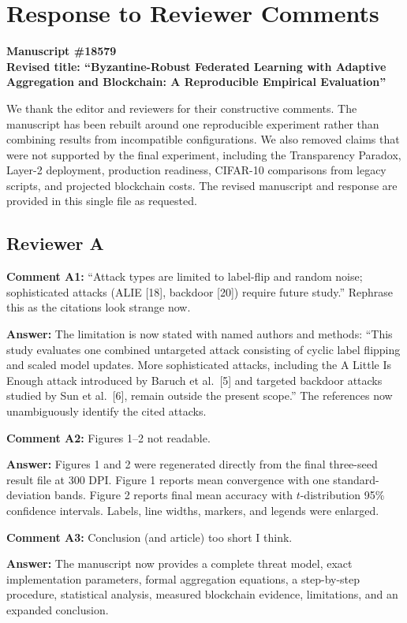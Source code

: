 \documentclass[10pt,letterpaper]{article}
\begin{document}
\section*{Response to Reviewer Comments}
\textbf{Manuscript \#18579}\\
\textbf{Revised title: ``Byzantine-Robust Federated Learning with Adaptive Aggregation and Blockchain: A Reproducible Empirical Evaluation''}

We thank the editor and reviewers for their constructive comments. The manuscript
has been rebuilt around one reproducible experiment rather than combining results
from incompatible configurations. We also removed claims that were not supported
by the final experiment, including the Transparency Paradox, Layer-2 deployment,
production readiness, CIFAR-10 comparisons from legacy scripts, and projected
blockchain costs. The revised manuscript and response are provided in this single
file as requested.

\subsection*{Reviewer A}
\textbf{Comment A1:} ``Attack types are limited to label-flip and random noise;
sophisticated attacks (ALIE [18], backdoor [20]) require future study.'' Rephrase
this as the citations look strange now.

\textbf{Answer:} The limitation is now stated with named authors and methods:
``This study evaluates one combined untargeted attack consisting of cyclic label
flipping and scaled model updates. More sophisticated attacks, including the A
Little Is Enough attack introduced by Baruch et al.~[5] and targeted backdoor
attacks studied by Sun et al.~[6], remain outside the present scope.'' The
references now unambiguously identify the cited attacks.

\textbf{Comment A2:} Figures 1--2 not readable.

\textbf{Answer:} Figures 1 and 2 were regenerated directly from the final
three-seed result file at 300 DPI. Figure 1 reports mean convergence with one
standard-deviation bands. Figure 2 reports final mean accuracy with
$t$-distribution 95\% confidence intervals. Labels, line widths, markers, and
legends were enlarged.

\textbf{Comment A3:} Conclusion (and article) too short I think.

\textbf{Answer:} The manuscript now provides a complete threat model, exact
implementation parameters, formal aggregation equations, a step-by-step
procedure, statistical analysis, measured blockchain evidence, limitations, and
an expanded conclusion.
\end{document}
